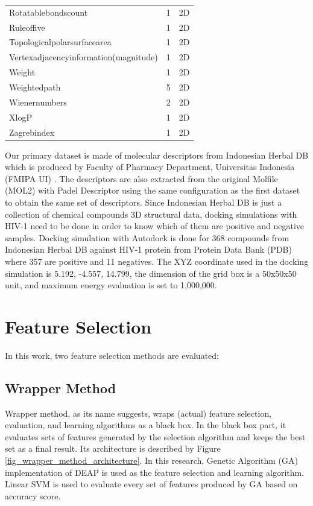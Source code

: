 \documentclass[conference]{IEEEtran}
\begin{document}
\begin{table}
\begin{tabular}{|l|c|c|}
		Rotatablebondscount & 	1  & 2D \\
		Ruleoffive & 	1  & 2D \\
		Topologicalpolarsurfacearea & 	1  & 2D \\
		Vertexadjacencyinformation(magnitude) & 	1  & 2D \\
		Weight & 	1  & 2D \\
		Weightedpath & 	5  & 2D \\
		Wienernumbers & 	2  & 2D \\
		XlogP & 	1  & 2D \\
		Zagrebindex & 	1  & 2D \\	
		\hline 
	\end{tabular} 
\end{table}	

Our primary dataset is made of molecular descriptors from Indonesian Herbal DB which is produced by Faculty of Pharmacy Department, Universitas Indonesia (FMIPA UI) \cite{yanuar2011medicinal}. The descriptors are also extracted from the original Molfile (MOL2) with Padel Descriptor using the same configuration as the first dataset to obtain the same set of descriptors. Since Indonesian Herbal DB is just a collection of chemical compounds 3D structural data, docking simulations with HIV-1 need to be done in order to know which of them are positive and negative samples. Docking simulation with Autodock is done for 368 compounds from Indonesian Herbal DB against HIV-1 protein from Protein Data Bank (PDB) where 357 are positive and 11 negatives. The XYZ coordinate used in the docking simulation is 5.192, -4.557, 14.799, the dimension of the grid box is a 50x50x50 unit, and maximum energy evaluation is set to 1,000,000.

\section{Feature Selection} \label{Feature Selection}

In this work, two feature selection methods are evaluated:

\subsection{Wrapper Method}

Wrapper method, as its name suggests, wraps (actual) feature selection, evaluation, and learning algorithms as a black box\cite{tang2014feature}. In the black box part, it evaluates sets of features generated by the selection algorithm and keeps the best set as a final result. Its architecture is described by Figure \ref{fig_wrapper_method_architecture}. In this research, Genetic Algorithm (GA) implementation of DEAP \cite{DEAP_JMLR2012} is used as the feature selection and learning algorithm. Linear SVM is used to evaluate every set of features produced by GA based on accuracy score.
\end{document}
